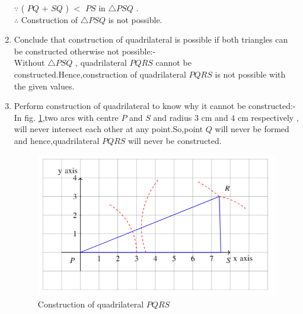 \documentclass[journal,12pt,twocolumn]{IEEEtran}
\begin{document}
\begin{enumerate}
    $\because$ ( $PQ$ + $SQ$ ) $<$ $PS$ in $\triangle PSQ$ .
    \\
    $\therefore$ Construction of $\triangle PSQ$ is not possible.
    
    \item Conclude that construction of quadrilateral is possible if both triangles can be constructed otherwise not possible:-
    \\
    Without $\triangle PSQ$ , quadrilateral $PQRS$ cannot be constructed.Hence,construction of quadrilateral $PQRS$ is not possible with the given values.
    
    \item Perform construction of quadrilateral to know why it cannot be constructed:-
    \\
    In fig. \ref{fig:const_quadrilateral},two arcs with centre $P$ and $S$ and radius 3 cm and 4 cm respectively , will never intersect each other at any point.So,point $Q$ will never be formed and hence,quadrilateral $PQRS$ will never be constructed.
    
    \begin{figure}[!ht]
    \centering
    \includegraphics[width=\columnwidth]{Figure2}
    \caption{Construction of quadrilateral $PQRS$}
    \label{fig:const_quadrilateral}	
    \end{figure}
  
\end{enumerate}
\end{document}
